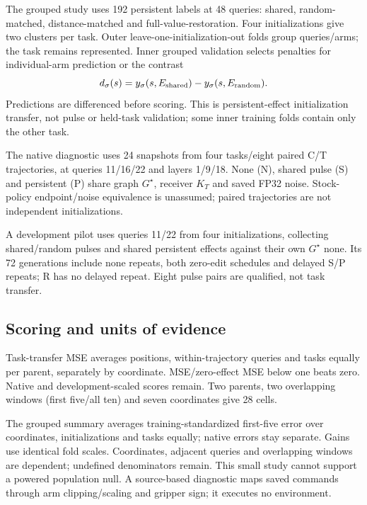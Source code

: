 \documentclass[conference]{IEEEtran}
\begin{document}
The grouped study uses 192 persistent labels at 48 queries: shared, random-matched, distance-matched and full-value-restoration. Four initializations give two clusters per task. Outer leave-one-initialization-out folds group queries/arms; the task remains represented. Inner grouped validation selects penalties for individual-arm prediction or the contrast
\begin{equation}
 d_{\sigma}(s)=y_{\sigma}(s,E_{\rm shared})
              -y_{\sigma}(s,E_{\rm random}).
 \label{eq:contrast}
\end{equation}
Predictions are differenced before scoring. This is persistent-effect initialization transfer, not pulse or held-task validation; some inner training folds contain only the other task.

The native diagnostic uses 24 snapshots from four tasks/eight paired C/T trajectories, at queries 11/16/22 and layers 1/9/18. None (N), shared pulse (S) and persistent (P) share graph $G^\star$, receiver $K_T$ and saved FP32 noise. Stock-policy endpoint/noise equivalence is unassumed; paired trajectories are not independent initializations.

A development pilot uses queries 11/22 from four initializations, collecting shared/random pulses and shared persistent effects against their own $G^\star$ none. Its 72 generations include none repeats, both zero-edit schedules and delayed S/P repeats; R has no delayed repeat. Eight pulse pairs are qualified, not task transfer.

\subsection{Scoring and units of evidence}
Task-transfer MSE averages positions, within-trajectory queries and tasks equally per parent, separately by coordinate. MSE/zero-effect MSE below one beats zero. Native and development-scaled scores remain. Two parents, two overlapping windows (first five/all ten) and seven coordinates give 28 cells.

The grouped summary averages training-standardized first-five error over coordinates, initializations and tasks equally; native errors stay separate. Gains use identical fold scales. Coordinates, adjacent queries and overlapping windows are dependent; undefined denominators remain. This small study cannot support a powered population null. A source-based diagnostic maps saved commands through arm clipping/scaling and gripper sign; it executes no environment.
\end{document}
